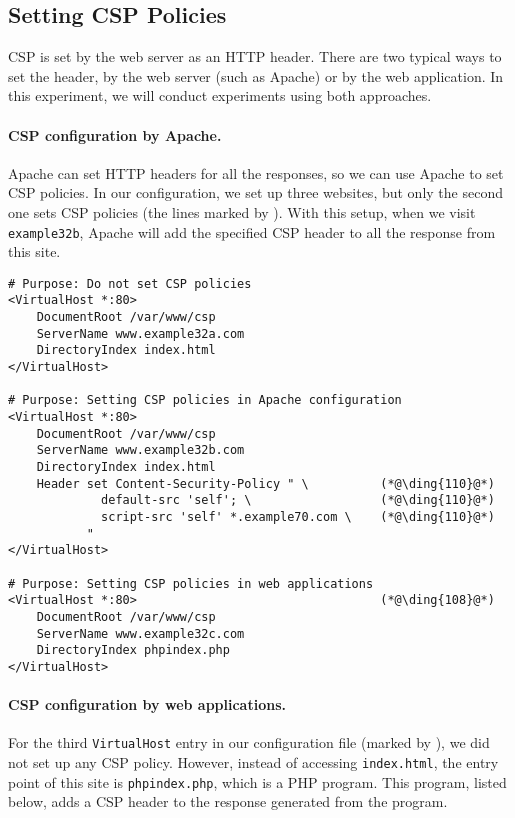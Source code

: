 \subsection{Setting CSP Policies}  

CSP is set by the web server as 
an HTTP header. There are two typical ways to set the header, 
by the web server (such as Apache) or by the web application. 
In this experiment, we will conduct experiments using 
both approaches. 

\paragraph{CSP configuration by Apache.}
Apache can set HTTP headers for all the responses, so we can
use Apache to set CSP policies. In our configuration, 
we set up three websites, but only the second one sets 
CSP policies (the lines marked by ). 
With this setup, when we visit \texttt{example32b}, 
Apache will add the specified CSP header to all 
the response from this site. 


\begin{lstlisting}
# Purpose: Do not set CSP policies
<VirtualHost *:80>
    DocumentRoot /var/www/csp
    ServerName www.example32a.com
    DirectoryIndex index.html
</VirtualHost>

# Purpose: Setting CSP policies in Apache configuration
<VirtualHost *:80>
    DocumentRoot /var/www/csp
    ServerName www.example32b.com
    DirectoryIndex index.html
    Header set Content-Security-Policy " \          (*@\ding{110}@*)
             default-src 'self'; \                  (*@\ding{110}@*)
             script-src 'self' *.example70.com \    (*@\ding{110}@*)
           "
</VirtualHost>

# Purpose: Setting CSP policies in web applications
<VirtualHost *:80>                                  (*@\ding{108}@*)
    DocumentRoot /var/www/csp
    ServerName www.example32c.com
    DirectoryIndex phpindex.php
</VirtualHost>
\end{lstlisting}
 

\paragraph{CSP configuration by web applications.}
For the third \texttt{VirtualHost} entry in our configuration
file (marked by ), we did not set up any CSP policy.
However, instead of accessing \texttt{index.html}, the 
entry point of this site is \texttt{phpindex.php}, which
is a PHP program. This program, listed below, adds 
a CSP header to the response generated from the program. 

